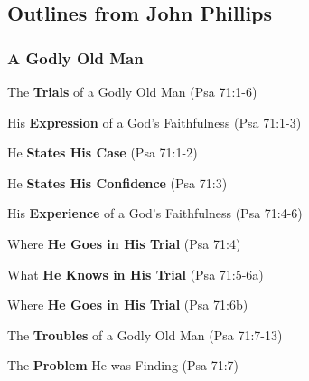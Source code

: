 \subsection{Outlines from John Phillips}

\subsubsection{A Godly Old Man}


\begin{compactenum}[I.][7]
    \item The \textbf{Trials} of a Godly Old Man (Psa 71:1-6)
    \begin{compactenum}[A.]
    		\item His \textbf{Expression} of a God's Faithfulness (Psa 71:1-3)\cite{Phillips2001ExploringPsalms1}
		\begin{compactenum}[1.]
    			\item He \textbf{States His Case}  (Psa 71:1-2)
    			\item He \textbf{States His Confidence}  (Psa 71:3)
		\end{compactenum}
    		\item His \textbf{Experience} of a God's Faithfulness (Psa 71:4-6)
		\begin{compactenum}[1.]
    			\item Where \textbf{He Goes in His Trial}  (Psa 71:4)
    			\item What \textbf{He Knows in His Trial}  (Psa 71:5-6a)
    			\item Where \textbf{He Goes in His Trial}  (Psa 71:6b)
		\end{compactenum}
    \end{compactenum}
    \item The \textbf{Troubles} of a Godly Old Man (Psa 71:7-13)
    \begin{compactenum}[A.]
    		\item The \textbf{Problem} He was Finding (Psa 71:7)

\end{compactenum}
\end{compactenum}
